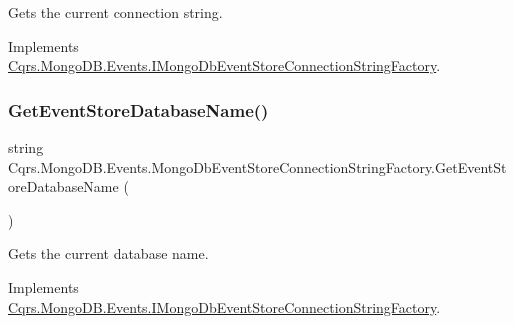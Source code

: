 Gets the current connection string. 



Implements \hyperlink{interfaceCqrs_1_1MongoDB_1_1Events_1_1IMongoDbEventStoreConnectionStringFactory_a3860ea4bf6793b081f03fb7cc1dcbb27_a3860ea4bf6793b081f03fb7cc1dcbb27}{Cqrs.\+Mongo\+D\+B.\+Events.\+I\+Mongo\+Db\+Event\+Store\+Connection\+String\+Factory}.

\mbox{\label{classCqrs_1_1MongoDB_1_1Events_1_1MongoDbEventStoreConnectionStringFactory_a282bda17095c8ea293f5305ea0d1b83c_a282bda17095c8ea293f5305ea0d1b83c}} 
\subsubsection{\texorpdfstring{Get\+Event\+Store\+Database\+Name()}{GetEventStoreDatabaseName()}}
{\footnotesize\ttfamily string Cqrs.\+Mongo\+D\+B.\+Events.\+Mongo\+Db\+Event\+Store\+Connection\+String\+Factory.\+Get\+Event\+Store\+Database\+Name (\begin{DoxyParamCaption}{ }\end{DoxyParamCaption})}



Gets the current database name. 



Implements \hyperlink{interfaceCqrs_1_1MongoDB_1_1Events_1_1IMongoDbEventStoreConnectionStringFactory_a81ee28bfbb0e567b95f2b280bc6fb298_a81ee28bfbb0e567b95f2b280bc6fb298}{Cqrs.\+Mongo\+D\+B.\+Events.\+I\+Mongo\+Db\+Event\+Store\+Connection\+String\+Factory}.



